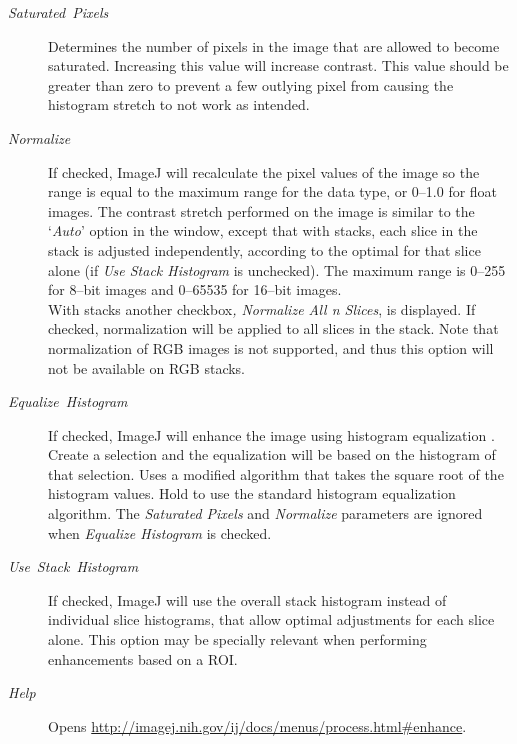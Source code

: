 \begin{description}
\item [{\emph{Saturated\ Pixels}}] Determines the number of pixels in
the image that are allowed to become saturated. Increasing this value
will increase contrast. This value should be greater than zero to
prevent a few outlying pixel from causing the histogram stretch to
not work as intended.
\item [{\emph{Normalize}}] If checked, ImageJ will recalculate the pixel
values of the image so the range is equal to the maximum range for
the data type, or 0--1.0 for float images. The contrast stretch performed
on the image is similar to the `\emph{Auto}' option in the 
window, except that with stacks, each slice in the stack is adjusted
independently, according to the optimal for that slice alone (if \emph{Use
Stack Histogram} is unchecked). The maximum range is 0--255 for 8--bit
images and 0--65535 for 16--bit images.\\
With stacks another checkbox\emph{, Normalize All n Slices}, is displayed.
If checked, normalization will be applied to all slices in the stack.
Note that normalization of RGB images is not supported, and thus this
option will not be available on RGB stacks.
\item [{\emph{Equalize\ Histogram}}] If checked, ImageJ will enhance the
image using histogram equalization \cite{C-EnhContrast}. Create a
selection and the equalization will be based on the histogram of that
selection. Uses a modified algorithm that takes the square root of
the histogram values. Hold  to use the standard
histogram equalization algorithm. The \emph{Saturated Pixels} and
\emph{Normalize} parameters are ignored when \emph{Equalize Histogram}
is checked.
\item [{\emph{Use}\ \emph{Stack}\ \emph{Histogram}}] If checked, ImageJ
will use the overall stack histogram instead of individual slice histograms,
that allow optimal adjustments for each slice alone. This option may
be specially relevant when performing enhancements based on a ROI.
\item [{\emph{Help}}] Opens \url{http://imagej.nih.gov/ij/docs/menus/process.html#enhance}.
\end{description}



\subsection{\protect{}}

